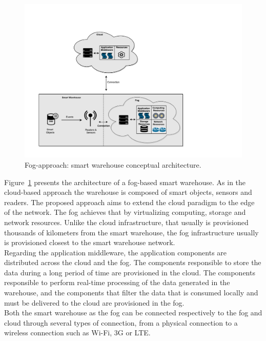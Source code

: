 \begin{figure}[ht!]
  \centering
  \includegraphics[width=\textwidth]{./images/solution_fog_architecture}
  \caption[Fog-approach: conceptual architecture.]{Fog-approach: smart warehouse conceptual architecture.}
  \label{fig:solution_fog_architecture}
\end{figure}

Figure~\ref{fig:solution_fog_architecture} presents the architecture of a fog-based smart warehouse.
As in the cloud-based approach the warehouse is composed of smart objects, sensors and readers.
The proposed approach aims to extend the cloud paradigm to the edge of the network. The fog achieves
that by virtualizing computing, storage and network resources. Unlike the cloud infrastructure, that
usually is provisioned thousands of kilometers from the smart warehouse, the fog infrastructure
usually is provisioned closest to the smart warehouse network.\\

Regarding the application middleware, the application components are distributed across the cloud and
the fog. The components responsible to store the data during a long period of time are provisioned in
the cloud. The components responsible to perform real-time processing of the data generated in the
warehouse, and the components that filter the data that is consumed locally and must be delivered to
the cloud are provisioned in the fog.\\

Both the smart warehouse as the fog can be connected respectively to the fog and cloud through
several types of connection, from a physical connection to a wireless connection such as Wi-Fi, 3G or
\gls{LTE}.

